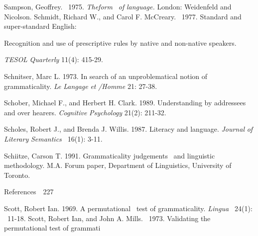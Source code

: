 \begin{styleStandard}
Sampson, Geoffrey. \ 1975. \textit{Theform }\textit{\ }\textit{of}\textit{ }\textit{language.}\textit{ }London: Weidenfeld and Nicolson. Schmidt, Richard W., and Carol F. McCreary. \ 1977. Standard and super-standard English:
\end{styleStandard}


\begin{styleStandard}
Recognition and use of prescriptive rules by native and non-native speakers.
\end{styleStandard}


\begin{styleStandard}
\textit{TESOL}\textit{ }\textit{Quarterly}\textit{ }11(4): 415-29.
\end{styleStandard}


\begin{styleStandard}
Schnitser, Marc L. 1973. In search of an unproblematical notion of grammaticality. \textit{Le}\textit{ }\textit{Langage}\textit{ }\textit{et}\textit{ }\textit{/{\textquotesingle}Homme}\textit{ }21: 27-38.
\end{styleStandard}


\begin{styleStandard}
Schober, Michael F., and Herbert H. Clark. 1989. Understanding by addressees and over\- hearers. \textit{Cognitive}\textit{ }\textit{Psychology}\textit{ }21(2): 211-32.
\end{styleStandard}


\begin{styleStandard}
Scholes, Robert J., and Brenda J. Willis. 1987. Literacy and language. \textit{Journal}\textit{ }\textit{of}\textit{ }\textit{Literary}\textit{ }\textit{Semantics }\textit{\ }16(1): 3-11.
\end{styleStandard}


\begin{styleStandard}
Schiitze, Carson T. 1991. Grammaticality judgements \ and linguistic methodology. M.A. Forum paper, Department of Linguistics, University of Toronto.
\end{styleStandard}


\clearpage\setcounter{page}{1}\begin{styleStandard}
References\ \ 227
\end{styleStandard}


\begin{styleStandard}
Scott, Robert Ian. 1969. A permutational \ test of grammaticality. \textit{Lingua }\textit{\ }24(1): \ 11-18. Scott, Robert Ian, and John A. Mills. \ 1973. Validating the permutational test of grammati\-
\end{styleStandard}


